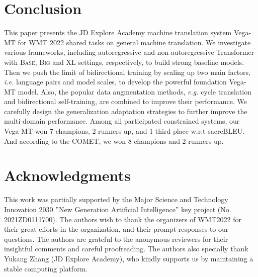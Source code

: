 \documentclass[11pt,a4paper]{article}
\newcommand{\zct}{\color{black}}
\begin{document}
\section{Conclusion}
\label{sec:con}
This paper presents the JD Explore Academy machine translation system Vega-MT for WMT 2022 {\zct shared tasks on general machine translation}. We investigate various frameworks, including autoregressive and non-autoregressive Transformer with \textsc{Base}, \textsc{Big} and \textsc{XL} settings, respectively, to build strong baseline models. Then we push the limit of bidirectional training by scaling up two main factors, \textit{i.e.} language pairs and model scales, to develop the powerful foundation Vega-MT model. Also, the popular data augmentation methods, \textit{e.g.} cycle translation and bidirectional self-training, are combined to improve their performance. We carefully design the generalization adaptation strategies to further improve the multi-domain performance. 
Among all participated constrained systems, our Vega-MT won 7 champions, 2 runners-up, and 1 third place w.r.t sacreBLEU. And according to the COMET, we won 8 champions and 2 runners-up.

\section*{Acknowledgments}
This work was partially supported by the Major Science and Technology Innovation 2030 ”New Generation Artificial Intelligence” key project (No. 2021ZD0111700).
The authors wish to thank the organizers of WMT2022 for their great efforts in the organization, and their prompt responses to our questions. The authors are grateful to the anonymous reviewers for their insightful comments and careful proofreading.
The authors also specially thank Yukang Zhang (JD Explore Academy), who kindly supports us by maintaining a stable computing platform.

\appendix
\end{document}
